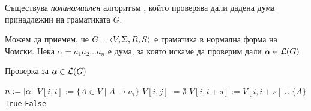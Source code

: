 \begin{thm}
  Съществува {\em полиномиален} алгоритъм , който проверява дали дадена дума принадлежни на граматиката $G$.
\end{thm}
Можем да приемем, че $G = \langle{V,\Sigma,R,S}\rangle$ е граматика в нормална форма на Чомски.
Нека $\alpha = a_1a_2\dots a_n$ е дума, за която искаме да проверим дали $\alpha \in \mathcal{L}(G)$.
\begin{algorithm}[H]
  \caption{Проверка за $\alpha \in \mathcal{L}(G)$}
  \label{alg:belongs-to-grammar}
  \begin{algorithmic}[1]
    \State $n := \lvert{\alpha}\rvert$ 
    \State $V[i,i] := \{A \in V \mid A\rightarrow a_i\}$
    \EndFor
    \State $V[i,j] := \emptyset$
    \EndFor      
    \ForAll{$s \in [1, n)$} 
    \ForAll{$k \in [i, i + s)$}
    \State $V[i,i+s] := V[i,i+s] \cup \{A\}$
    \EndIf
    \EndFor
    \EndFor
    \EndFor
    \State \Return \texttt{True}
    \Else
    \State \Return \texttt{False}
    \EndIf
  \end{algorithmic}
\end{algorithm}

